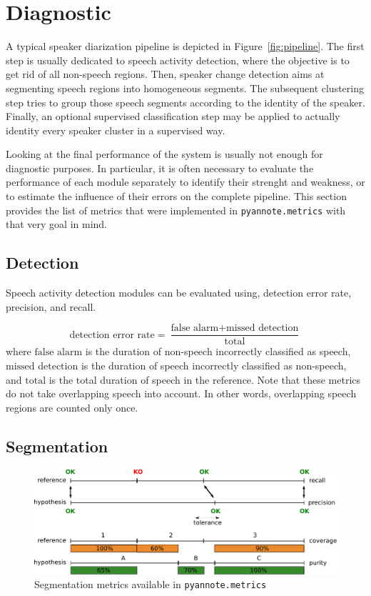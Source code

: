 \documentclass[a4paper]{article}
\newcommand*\metrics{\texttt{\footnotesize{pyannote.metrics}}}
\begin{document}
\section{Diagnostic}
\label{sec:diagnostic}

A typical speaker diarization pipeline is depicted in Figure~\ref{fig:pipeline}.
The first step is usually dedicated to speech activity detection, where the objective is to get rid of all non-speech regions.
Then, speaker change detection aims at segmenting speech regions into homogeneous segments.
The subsequent clustering step tries to group those speech segments according to the identity of the speaker.
Finally, an optional supervised classification step may be applied to actually identity every speaker cluster in a supervised way.

Looking at the final performance of the system is usually not enough for diagnostic purposes.
In particular, it is often necessary to evaluate the performance of each module separately to identify their strenght and weakness, or to estimate the influence of their errors on the complete pipeline.
This section provides the list of metrics that were implemented in \metrics{} with that very goal in mind.

\subsection{Detection}

Speech activity detection modules can be evaluated using, detection error rate, precision, and recall.

\begin{equation*}
  \text{detection error rate} = \frac{\text{false alarm} + \text{missed detection}}{\text{total}}
\end{equation*}
where $\text{false alarm}$ is the duration of non-speech incorrectly classified as speech, $\text{missed detection}$ is the duration of
speech incorrectly classified as non-speech, and $\text{total}$ is the total duration of speech in the reference.
Note that these metrics do not take overlapping speech into account.
In other words, overlapping speech regions are counted only once.

\subsection{Segmentation}

\begin{figure}[htb]
  \centering
  \includegraphics[width=1.0\linewidth]{figures/segmentation.pdf}
  \caption{Segmentation metrics available in \metrics{}}
  \label{fig:segmentation}
\end{figure}
\end{document}
